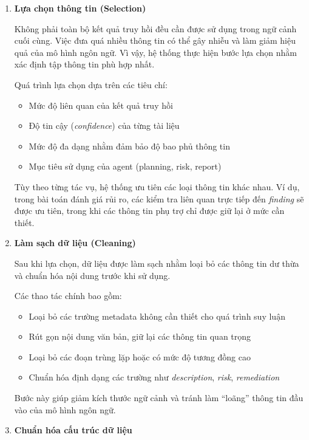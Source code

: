 \begin{enumerate}
    \item \textbf{Lựa chọn thông tin (Selection)}

    Không phải toàn bộ kết quả truy hồi đều cần được sử dụng trong ngữ cảnh cuối cùng. Việc đưa quá nhiều thông tin có thể gây nhiễu và làm giảm hiệu quả của mô hình ngôn ngữ. Vì vậy, hệ thống thực hiện bước lựa chọn nhằm xác định tập thông tin phù hợp nhất.

    Quá trình lựa chọn dựa trên các tiêu chí:
    \begin{itemize}
        \item Mức độ liên quan của kết quả truy hồi
        \item Độ tin cậy (\textit{confidence}) của từng tài liệu
        \item Mức độ đa dạng nhằm đảm bảo độ bao phủ thông tin
        \item Mục tiêu sử dụng của agent (planning, risk, report)
    \end{itemize}

    Tùy theo từng tác vụ, hệ thống ưu tiên các loại thông tin khác nhau. Ví dụ, trong bài toán đánh giá rủi ro, các kiểm tra liên quan trực tiếp đến \textit{finding} sẽ được ưu tiên, trong khi các thông tin phụ trợ chỉ được giữ lại ở mức cần thiết.

    \item \textbf{Làm sạch dữ liệu (Cleaning)}

    Sau khi lựa chọn, dữ liệu được làm sạch nhằm loại bỏ các thông tin dư thừa và chuẩn hóa nội dung trước khi sử dụng.

    Các thao tác chính bao gồm:
    \begin{itemize}
        \item Loại bỏ các trường metadata không cần thiết cho quá trình suy luận
        \item Rút gọn nội dung văn bản, giữ lại các thông tin quan trọng
        \item Loại bỏ các đoạn trùng lặp hoặc có mức độ tương đồng cao
        \item Chuẩn hóa định dạng các trường như \textit{description}, \textit{risk}, \textit{remediation}
    \end{itemize}

    Bước này giúp giảm kích thước ngữ cảnh và tránh làm ``loãng'' thông tin đầu vào của mô hình ngôn ngữ.

    \item \textbf{Chuẩn hóa cấu trúc dữ liệu}


\end{enumerate}

